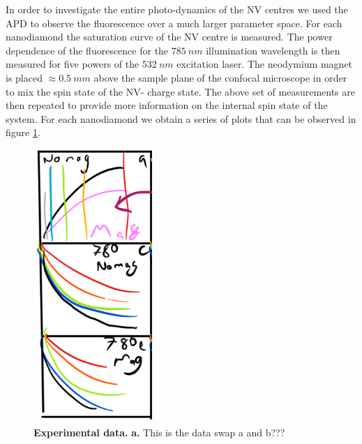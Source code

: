 \documentclass[prl]{revtex4}
\begin{document}
In order to investigate the entire photo-dynamics of the NV centres we used the APD to observe the fluorescence over a much larger parameter space. For each nanodiamond the saturation curve of the NV centre is measured. The power dependence of the fluorescence for the $\SI{785}{nm}$ illumination wavelength is then measured for five powers of the $\SI{532}{nm}$ excitation laser. The neodymium magnet is placed $\approx \SI{0.5}{mm}$ above the sample plane of the confocal microscope in order to mix the spin state of the NV- charge state. The above set of measurements are then repeated to provide more information on the internal spin state of the system. For each nanodiamond we obtain a series of plots that can be observed in figure \ref{FigData}.

\begin{figure}[H]
  \centering
  \includegraphics[width=0.4\textwidth]{Data2.png} 
 \caption{\textbf{Experimental data.} \textbf{a.} This is the data swap a and b???} \label{FigData}
\end{figure}
\end{document}
